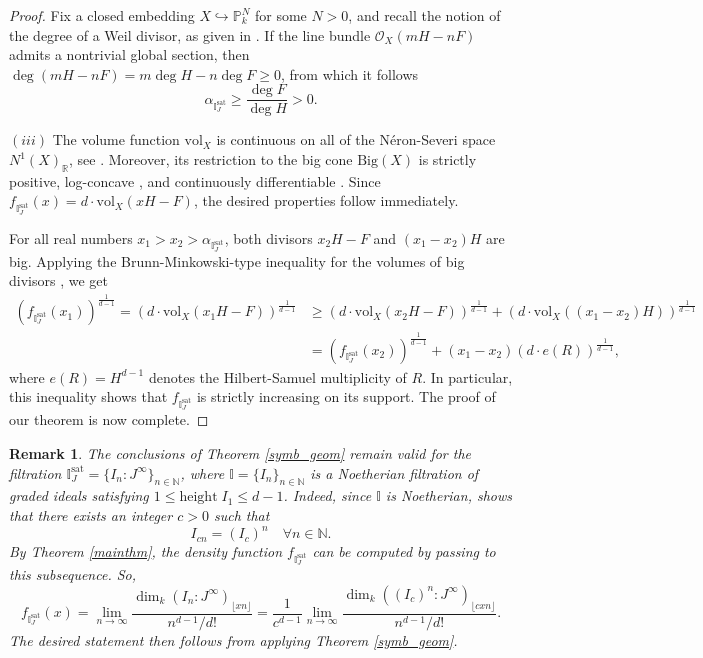 \documentclass[12pt,a4paper]{amsart}
\theoremstyle{plain}
\newtheorem{remark}[theorem]{Remark}
\theoremstyle{definition}
\numberwithin{equation}{theorem}
\begin{document}
\begin{proof}
Fix a closed embedding $X\hookrightarrow \mathbb{P}^N_k$ for some $N>0$, and recall the notion of the degree of a Weil divisor, as given in \cite[Chapter II, Exercise 6.2]{Har77}. If the line bundle $\mathcal{O}_X(mH-nF)$ admits a nontrivial global section, then $\deg (mH-nF) = m\deg H - n\deg F \geq 0$, from which it follows $$\alpha_{\mathbb{I}^{\mathrm{sat}}_J}\geq \frac{\deg F}{\deg H}>0.$$

\textit{$(iii)$} The volume function $\mathrm{vol}_X$ is continuous on all of the N\'{e}ron-Severi space $ N^1(X)_{\mathbb{R}}$, see \cite[Corollary 2.2.45]{Laz04a}. Moreover, its restriction to the big cone $\mathrm{Big}(X)$ is strictly positive, log-concave \cite[Corollary 4.12]{LM09}, and continuously differentiable \cite[Corollary 4.27]{LM09}. Since $f_{\mathbb{I}^{\mathrm{sat}}_J}(x) = d\cdot\mathrm{vol}_X(xH-F)$, the desired properties follow immediately.

For all real numbers $x_1>x_2>\alpha_{\mathbb{I}^{\mathrm{sat}}_J}$, both divisors $x_2H-F$ and $(x_1-x_2)H$ are big. Applying the Brunn-Minkowski-type inequality for the volumes of big divisors \cite[Corollary 4.12]{LM09}, we get
\begin{align*}
 {\left(f_{\mathbb{I}^{\mathrm{sat}}_J}(x_1)\right)}^{\tfrac{1}{d-1}} = {\left(d\cdot\mathrm{vol}_X(x_1H-F)\right)}^{\tfrac{1}{d-1}} &\geq {\left(d\cdot\mathrm{vol}_X(x_2H-F)\right)}^{\tfrac{1}{d-1}} + {\left(d\cdot\mathrm{vol}_X\left((x_1-x_2)H\right)\right)}^{\tfrac{1}{d-1}}\\
 &= {\left(f_{\mathbb{I}^{\mathrm{sat}}_J}(x_2)\right)}^{\tfrac{1}{d-1}} + (x_1-x_2){(d\cdot e(R))}^{\tfrac{1}{d-1}},
\end{align*}
where $e(R) = H^{d-1}$ denotes the Hilbert-Samuel multiplicity of $R$. In particular, this inequality shows that $f_{\mathbb{I}^{\mathrm{sat}}_J}$ is strictly increasing on its support. The proof of our theorem is now complete.
\end{proof}

\begin{remark}\label{symb_geom_rem}
The conclusions of Theorem \ref{symb_geom} remain valid for the filtration $\mathbb{I}^{\mathrm{sat}}_J = \{I_n \colon J^{\infty}\}_{n\in\mathbb{N}}$, where $\mathbb{I} = \{I_n\}_{n\in\mathbb{N}}$ is a Noetherian filtration of graded ideals satisfying $1\leq \mathrm{height}\;I_1\leq d-1$. Indeed, since $\mathbb{I}$ is Noetherian, \cite[Theorem 2.1]{HHT07} shows that there exists an integer $c>0$ such that $$I_{cn} = (I_c)^n \quad \forall n\in\mathbb{N}.$$ By Theorem \ref{mainthm}, the density function $f_{\mathbb{I}^{\mathrm{sat}}_J}$ can be computed by passing to this subsequence. So, $$f_{\mathbb{I}^{\mathrm{sat}}_J}(x) = \lim_{n\to\infty}\dfrac{\dim_k\left(I_n \colon J^{\infty}\right)_{\lfloor xn\rfloor}}{n^{d-1}/d!} = \dfrac{1}{c^{d-1}}\lim_{n\to\infty}\dfrac{\dim_k\left((I_c)^n \colon J^{\infty}\right)_{\lfloor cxn\rfloor}}{n^{d-1}/d!}.$$ The desired statement then follows from applying Theorem \ref{symb_geom}.
\end{remark}
\end{document}
